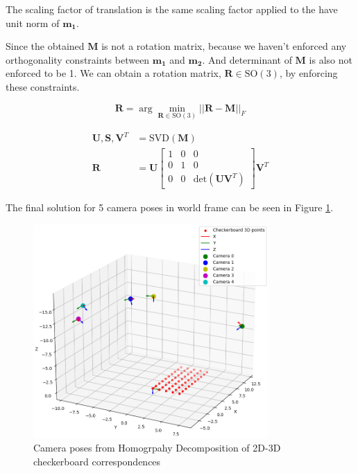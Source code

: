 \documentclass{article}
\begin{document}
The scaling factor of translation is the same scaling factor applied to the have unit norm of $\mathbf{m_1}$. 

Since the obtained $\mathbf{M}$ is not a rotation matrix, because we haven't enforced any orthogonality constraints between $\mathbf{m_1}$ and $\mathbf{m_2}$. 
And determinant of $\mathbf{M}$ is also not enforced to be 1. We can obtain a rotation matrix, $\mathbf{R} \in \mathrm{SO}(3)
$, by enforcing these constraints.



\begin{equation}
    \mathbf{R} = \arg\min_{\mathbf{R} \in \mathrm{SO}(3)} ||\mathbf{R} - \mathbf{M}||_F
\end{equation}
    
\begin{align}
    \mathbf{U}, \mathbf{S}, \mathbf{V}^T &= \mathrm{SVD}(\mathbf{M}) \\
    \mathbf{R} &= \mathbf{U} \begin{bmatrix} 1 & 0 & 0 \\ 0 & 1 & 0 \\ 0 & 0 & \mathrm{det}(\mathbf{U} \mathbf{V}^T) \end{bmatrix} \mathbf{V}^T
\end{align}

The final solution for 5 camera poses in world frame can be seen in Figure \ref{fig:env_cam_frame}.

\begin{figure}[h]
    \centering
    \includegraphics[width=0.8\textwidth]{images/env_cam_frame.png}
    \caption{Camera poses from Homogrpahy Decomposition of 2D-3D checkerboard correspondences}
    \label{fig:env_cam_frame}
\end{figure}
\end{document}
